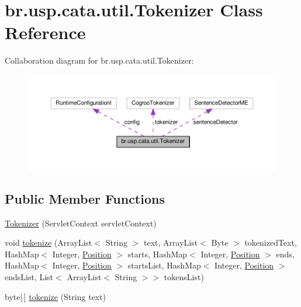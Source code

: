 \hypertarget{classbr_1_1usp_1_1cata_1_1util_1_1_tokenizer}{\section{br.\+usp.\+cata.\+util.\+Tokenizer Class Reference}
\label{classbr_1_1usp_1_1cata_1_1util_1_1_tokenizer}
}


Collaboration diagram for br.\+usp.\+cata.\+util.\+Tokenizer\+:\nopagebreak
\begin{figure}[H]
\begin{center}
\leavevmode
\includegraphics[width=350pt]{classbr_1_1usp_1_1cata_1_1util_1_1_tokenizer__coll__graph}
\end{center}
\end{figure}
\subsection*{Public Member Functions}
\begin{DoxyCompactItemize}
\item 
\hyperlink{classbr_1_1usp_1_1cata_1_1util_1_1_tokenizer_aae86113c14e59974da04426a2cd3c96b}{Tokenizer} (Servlet\+Context servlet\+Context)
\item 
void \hyperlink{classbr_1_1usp_1_1cata_1_1util_1_1_tokenizer_a9d45ccfea6e425a3c4396cdc2c49ce1f}{tokenize} (Array\+List$<$ String $>$ text, Array\+List$<$ Byte $>$ tokenized\+Text, Hash\+Map$<$ Integer, \hyperlink{classbr_1_1usp_1_1cata_1_1model_1_1_position}{Position} $>$ starts, Hash\+Map$<$ Integer, \hyperlink{classbr_1_1usp_1_1cata_1_1model_1_1_position}{Position} $>$ ends, Hash\+Map$<$ Integer, \hyperlink{classbr_1_1usp_1_1cata_1_1model_1_1_position}{Position} $>$ starts\+List, Hash\+Map$<$ Integer, \hyperlink{classbr_1_1usp_1_1cata_1_1model_1_1_position}{Position} $>$ ends\+List, List$<$ Array\+List$<$ String $>$$>$ tokens\+List)
\item 
byte\mbox{[}$\,$\mbox{]} \hyperlink{classbr_1_1usp_1_1cata_1_1util_1_1_tokenizer_abb003fc6b5c05abb5f0d2793516bfc5e}{tokenize} (String text)
\end{DoxyCompactItemize}
